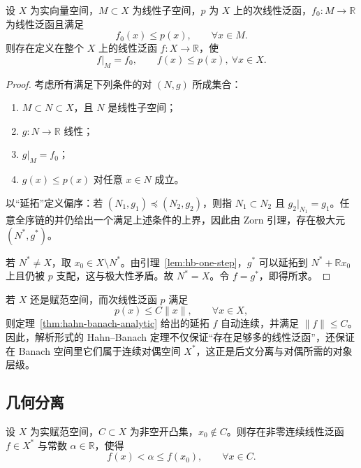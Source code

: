 \begin{theorem}\label{thm:hahn-banach-analytic}
设 $X$ 为实向量空间，$M\subset X$ 为线性子空间，$p$ 为 $X$ 上的次线性泛函，$f_0\colon M\to\mathbb R$ 为线性泛函且满足
\[
f_0(x)\le p(x),\qquad \forall x\in M.
\]
则存在定义在整个 $X$ 上的线性泛函 $f\colon X\to\mathbb R$，使
\[
f|_M=f_0,\qquad f(x)\le p(x),\ \forall x\in X.
\]
\end{theorem}

\begin{proof}
考虑所有满足下列条件的对 $(N,g)$ 所成集合：
\begin{enumerate}
  \item $M\subset N\subset X$，且 $N$ 是线性子空间；
  \item $g\colon N\to\mathbb R$ 线性；
  \item $g|_M=f_0$；
  \item $g(x)\le p(x)$ 对任意 $x\in N$ 成立。
\end{enumerate}
以“延拓”定义偏序：若 $(N_1,g_1)\preceq (N_2,g_2)$，则指 $N_1\subset N_2$ 且 $g_2|_{N_1}=g_1$。任意全序链的并仍给出一个满足上述条件的上界，因此由 Zorn 引理，存在极大元 $(N^\ast,g^\ast)$。

若 $N^\ast\neq X$，取 $x_0\in X\setminus N^\ast$。由引理~\ref{lem:hb-one-step}，$g^\ast$ 可以延拓到 $N^\ast+\mathbb R x_0$ 上且仍被 $p$ 支配，这与极大性矛盾。故 $N^\ast=X$。令 $f=g^\ast$，即得所求。
\end{proof}

\begin{remark}
若 $X$ 还是赋范空间，而次线性泛函 $p$ 满足
\[
p(x)\le C\|x\|,\qquad \forall x\in X,
\]
则定理~\ref{thm:hahn-banach-analytic} 给出的延拓 $f$ 自动连续，并满足 $\|f\|\le C$。因此，解析形式的 Hahn--Banach 定理不仅保证“存在足够多的线性泛函”，还保证在 Banach 空间里它们属于连续对偶空间 $X^\ast$，这正是后文分离与对偶所需的对象层级。
\end{remark}

\subsection{几何分离}

\begin{theorem}\label{thm:hahn-banach-geometric}
设 $X$ 为实赋范空间，$C\subset X$ 为非空开凸集，$x_0\notin C$。则存在非零连续线性泛函 $f\in X^\ast$ 与常数 $\alpha\in\mathbb R$，使得
\[
f(x)<\alpha\le f(x_0),\qquad \forall x\in C.
\]
\end{theorem}

